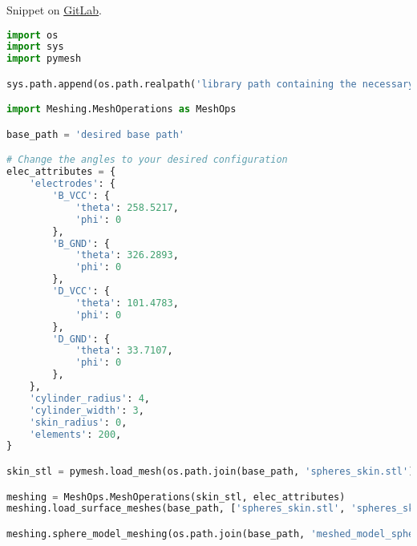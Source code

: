 \pagebreak
\noindent Snippet on \href{https://gitlab.com/ttis-simulations/ttis-software/-/snippets/2067442}{GitLab}.
\begin{lstlisting}[language=Python,caption={Meshing of the spherical layered model},captionpos=b,label=lst:sphere_model_meshsing]
import os
import sys
import pymesh

sys.path.append(os.path.realpath('library path containing the necessary scripts'))

import Meshing.MeshOperations as MeshOps

base_path = 'desired base path'

# Change the angles to your desired configuration
elec_attributes = {
	'electrodes': {
		'B_VCC': {
			'theta': 258.5217,
			'phi': 0
		},
		'B_GND': {
			'theta': 326.2893,
			'phi': 0
		},
		'D_VCC': {
			'theta': 101.4783,
			'phi': 0
		},
		'D_GND': {
			'theta': 33.7107,
			'phi': 0
		},
	},
	'cylinder_radius': 4,
	'cylinder_width': 3,
	'skin_radius': 0,
	'elements': 200,
}

skin_stl = pymesh.load_mesh(os.path.join(base_path, 'spheres_skin.stl'))

meshing = MeshOps.MeshOperations(skin_stl, elec_attributes)
meshing.load_surface_meshes(base_path, ['spheres_skin.stl', 'spheres_skull.stl', 'spheres_csf.stl', 'spheres_brain.stl'])

meshing.sphere_model_meshing(os.path.join(base_path, 'meshed_model_sphere.poly'))    
\end{lstlisting}

